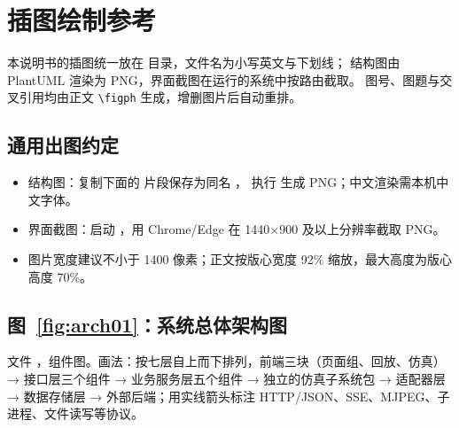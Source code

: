 
\chapter{插图绘制参考}

本说明书的插图统一放在  目录，文件名为小写英文与下划线；
结构图由 PlantUML 渲染为 PNG，界面截图在运行的系统中按路由截取。
图号、图题与交叉引用均由正文 \verb|\figph| 生成，增删图片后自动重排。

\section{通用出图约定}

\begin{itemize}[leftmargin=2em,itemsep=0.2em]
\item 结构图：复制下面的  片段保存为同名 ，
  执行  生成 PNG；中文渲染需本机中文字体。
\item 界面截图：启动 ，用 Chrome/Edge 在 1440×900 及以上分辨率截取 PNG。
\item 图片宽度建议不小于 1400 像素；正文按版心宽度 92\% 缩放，最大高度为版心高度 70\%。
\end{itemize}

\section{图~\ref{fig:arch01}：系统总体架构图}

文件 ，组件图。画法：按七层自上而下排列，前端三块（页面组、回放、仿真）→ 接口层三个组件 → 业务服务层五个组件 → 独立的仿真子系统包 → 适配器层 → 数据存储层 → 外部后端；用实线箭头标注 HTTP/JSON、SSE、MJPEG、子进程、文件读写等协议。

